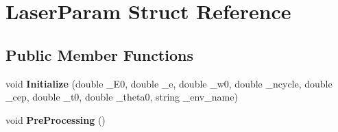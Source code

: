 \hypertarget{struct_laser_param}{}\section{Laser\+Param Struct Reference}
\label{struct_laser_param}
\subsection*{Public Member Functions}
\begin{DoxyCompactItemize}
\item 
\mbox{\label{struct_laser_param_ab8b5218a42f2b886247b45595e52690b}} 
void {\bfseries Initialize} (double \+\_\+\+E0, double \+\_\+e, double \+\_\+w0, double \+\_\+ncycle, double \+\_\+cep, double \+\_\+t0, double \+\_\+theta0, string \+\_\+env\+\_\+name)
\item 
\mbox{\label{struct_laser_param_a3c44f28bfdf29764aea17d811272e6f4}} 
void {\bfseries Pre\+Processing} ()
\end{DoxyCompactItemize}
